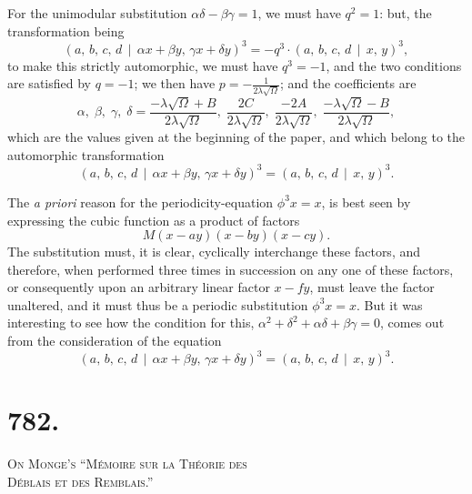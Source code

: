 \documentclass[11pt,a4paper]{article}
\theoremstyle{cayley}
\begin{document}
For the unimodular substitution $\alpha\delta - \beta\gamma = 1$, we must have $q^{2} = 1$: but, the transformation being
\[
(a,\, b,\, c,\, d \,\!\!\mid\!\!\, \alpha x + \beta y,\, \gamma x + \delta y)^{3} = -q^{3} \cdot (a,\, b,\, c,\, d \,\!\!\mid\!\!\, x,\, y)^{3},
\]
to make this strictly automorphic, we must have $q^{3} = -1$, and the two conditions are satisfied by $q = -1$; we then have $p = -\frac{1}{2\lambda\sqrt{\Omega}}$; and the coefficients are
\[
\alpha,\; \beta,\; \gamma,\; \delta = \frac{-\lambda\sqrt{\Omega} + B}{2\lambda\sqrt{\Omega}},\; \frac{2C}{2\lambda\sqrt{\Omega}},\; \frac{-2A}{2\lambda\sqrt{\Omega}},\; \frac{-\lambda\sqrt{\Omega} - B}{2\lambda\sqrt{\Omega}},
\]
which are the values given at the beginning of the paper, and which belong to the automorphic transformation
\[
(a,\, b,\, c,\, d \,\!\!\mid\!\!\, \alpha x + \beta y,\, \gamma x + \delta y)^{3} = (a,\, b,\, c,\, d \,\!\!\mid\!\!\, x,\, y)^{3}.
\]

The \textit{a priori} reason for the periodicity-equation $\phi^{3}x = x$, is best seen by expressing the cubic function as a product of factors
\[
M(x - ay)(x - by)(x - cy).
\]
The substitution must, it is clear, cyclically interchange these factors, and therefore, when performed three times in succession on any one of these factors, or consequently upon an arbitrary linear factor $x - fy$, must leave the factor unaltered, and it must thus be a periodic substitution $\phi^{3}x = x$. But it was interesting to see how the condition for this, $\alpha^{2} + \delta^{2} + \alpha\delta + \beta\gamma = 0$, comes out from the consideration of the equation
\[
(a,\, b,\, c,\, d \,\!\!\mid\!\!\, \alpha x + \beta y,\, \gamma x + \delta y)^{3} = (a,\, b,\, c,\, d \,\!\!\mid\!\!\, x,\, y)^{3}.
\]

\newpage

\section*{782.}

\begin{center}
\Large\scshape On Monge's ``M\'{e}moire sur la Th\'{e}orie des\\D\'{e}blais et des Remblais.''
\end{center}
\end{document}
